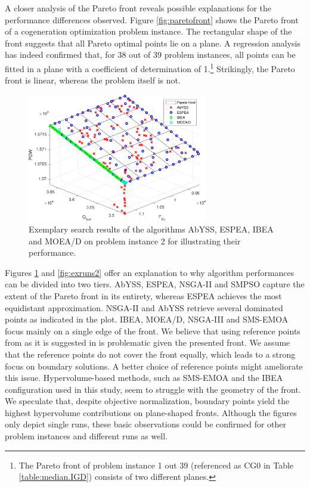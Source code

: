 A closer analysis of the Pareto front reveals possible explanations for the performance differences observed. Figure \ref{fig:paretofront} shows the Pareto front of a cogeneration optimization problem instance. The rectangular shape of the front suggests that all Pareto optimal points lie on a plane. A regression analysis has indeed confirmed that, for 38 out of 39 problem instances, all points can be fitted in a plane with a coefficient of determination of 1.\footnote{The Pareto front of problem instance 1 out 39 (referenced as CG0 in Table \ref{table:median.IGD}) consists of two different planes.} Strikingly, the Pareto front is linear, whereas the problem itself is not.

\begin{figure}
\centering
\includegraphics[width=0.7\textwidth]{figures/example1_cropped.pdf}
\caption{Exemplary search results of the algorithms AbYSS, ESPEA, IBEA and MOEA/D on problem instance 2 for illustrating their performance.}
\label{fig:exruns1}
\end{figure}

Figures \ref{fig:exruns1} and \ref{fig:exruns2} offer an explanation to why algorithm performances can be divided into two tiers. AbYSS, ESPEA, NSGA-II and SMPSO capture the extent of the Pareto front in its entirety, whereas ESPEA achieves the most equidistant approximation. NSGA-II and AbYSS retrieve several dominated points as indicated in the plot. IBEA, MOEA/D, NSGA-III and SMS-EMOA focus mainly on a single edge of the front. We believe that using reference points from \cite{nbi} as it is suggested in \cite{moead2009,nsga3part1} is problematic given the presented front. We assume that the reference points do not cover the front equally, which leads to a strong focus on boundary solutions. A better choice of reference points might ameliorate this issue. Hypervolume-based methods, such as SMS-EMOA and the IBEA configuration used in this study, seem to struggle with the geometry of the front. We speculate that, despite objective normalization, boundary points yield the highest hypervolume contributions on plane-shaped fronts. Although the figures only depict single runs, these basic observations could be confirmed for other problem instances and different runs as well.

